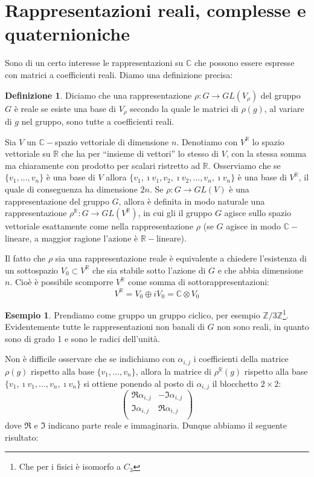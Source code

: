 \documentclass[11pt]{article}
\theoremstyle{plain}
\theoremstyle{definition}
\newtheorem{defn}{Definizione}[section]
\newtheorem{exmp}{Esempio}[section]
\theoremstyle{remark}
\newcommand{\C}{\mathbb{C}}
\newcommand{\R}{\mathbb{R}}
\newcommand{\Z}{\mathbb{Z}}
\begin{document}
\newpage
\section{Rappresentazioni reali, complesse e quaternioniche}

Sono di un certo interesse le rappresentazioni su $\C$ che possono essere espresse con matrici a coefficienti reali. Diamo una definizione precisa:

\begin{defn}
Diciamo che una rappresentazione $\rho:G\to GL(V_\rho)$ del gruppo $G$ è reale se esiste una base di $V_\rho$ secondo la quale
le matrici di $\rho(g)$, al variare di $g$ nel gruppo, sono tutte a coefficienti reali.
\label{def: rappr reale}
\end{defn}

Sia $V$ un $\C-$spazio vettoriale di dimensione $n$.
Denotiamo con $V^\R$ lo spazio vettoriale su $\R$ che ha per ``insieme di vettori''
lo stesso di $V$, con la stessa somma ma chiaramente con prodotto per scalari ristretto ad $\R$.
Osserviamo che se $\{v_1, \dots, v_n\}$ è una base di $V$ allora 
$\{v_1, \imath v_1, v_2, \imath v_2,\dots, v_n, \imath v_n\}$ è una base di $V^\R$, il quale di conseguenza ha dimensione $2n$.
Se $\rho:G\to GL(V)$ è una rappresentazione del gruppo $G$, allora è definita 
in modo naturale una rappresentazione $\rho^\R:G\to GL(V^\R)$, in cui gli il gruppo $G$
agisce sullo spazio vettoriale esattamente come nella rappresentazione $\rho$ (se $G$ agisce 
in modo $\C-$lineare, a maggior ragione l'azione è $\R-$lineare).

Il fatto che $\rho$ sia una rappresentazione reale è equivalente a chiedere l'esistenza di un sottospazio $V_0 \subset V^\R$ che sia stabile sotto l'azione di $G$ e che abbia dimensione $n$. Cioè è possibile scomporre $V^\R$ come somma di sottorappresentazioni:
\[ V^\R = V_0 \oplus i V_0 = \C \otimes V_0 \]

\begin{exmp}
Prendiamo come gruppo un gruppo ciclico, per esempio $\Z / 3\Z$\footnote{Che per i fisici è isomorfo a $C_3$}. Evidentemente tutte le rappresentazioni non banali di $G$ non sono reali, in quanto sono di grado 1 e sono le radici dell'unità.
\end{exmp}

Non è difficile osservare che se indichiamo con $\alpha_{i,j}$ i coefficienti della matrice $\rho(g)$
rispetto alla base $\{v_1, \dots, v_n\}$, allora la matrice di $\rho^\R(g)$ rispetto alla base
$\{v_1, \imath v_1,\dots, v_n, \imath v_n\}$ si ottiene
ponendo al posto di $\alpha_{i,j}$ il blocchetto $2\times 2$:
\[\begin{pmatrix}
	\Re \alpha_{i,j} & -\Im \alpha_{i,j}\\
	\Im \alpha_{i,j} & \Re \alpha_{i,j}\\
\end{pmatrix}\]
dove $\Re$ e $\Im$ indicano parte reale e immaginaria.
Dunque abbiamo il seguente risultato:
\end{document}
